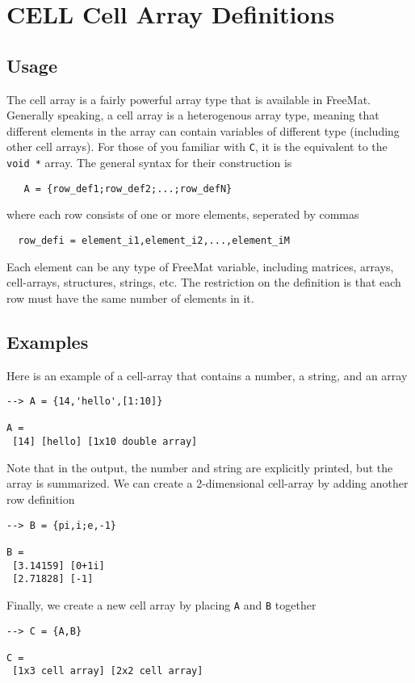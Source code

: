 \section{CELL Cell Array Definitions}

\subsection{Usage}

The cell array is a fairly powerful array type that is available
in FreeMat.  Generally speaking, a cell array is a heterogenous
array type, meaning that different elements in the array can 
contain variables of different type (including other cell arrays).
For those of you familiar with \verb|C|, it is the equivalent to the
\verb|void *| array.  The general syntax for their construction is
\begin{verbatim}
   A = {row_def1;row_def2;...;row_defN}
\end{verbatim}
where each row consists of one or more elements, seperated by
commas
\begin{verbatim}
  row_defi = element_i1,element_i2,...,element_iM
\end{verbatim}
Each element can be any type of FreeMat variable, including
matrices, arrays, cell-arrays, structures, strings, etc.  The
restriction on the definition is that each row must have the
same number of elements in it.
\subsection{Examples}

Here is an example of a cell-array that contains a number,
a string, and an array
\begin{verbatim}
--> A = {14,'hello',[1:10]}

A = 
 [14] [hello] [1x10 double array] 
\end{verbatim}
Note that in the output, the number and string are explicitly
printed, but the array is summarized.
We can create a 2-dimensional cell-array by adding another
row definition
\begin{verbatim}
--> B = {pi,i;e,-1}

B = 
 [3.14159] [0+1i] 
 [2.71828] [-1] 
\end{verbatim}
Finally, we create a new cell array by placing \verb|A| and \verb|B|
together
\begin{verbatim}
--> C = {A,B}

C = 
 [1x3 cell array] [2x2 cell array] 
\end{verbatim}
